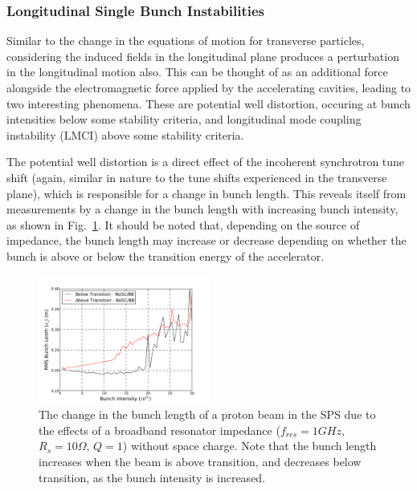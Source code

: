 \subsubsection{Longitudinal Single Bunch Instabilities}

Similar to the change in the equations of motion for transverse particles, considering the induced fields in the longitudinal plane produces a perturbation in the longitudinal motion also. This can be thought of as an additional force alongside the electromagnetic force applied by the accelerating cavities, leading to two interesting phenomena. These are potential well distortion, occuring at bunch intensities below some stability criteria, and longitudinal mode coupling instability (LMCI) above some stability criteria.

The potential well distortion is a direct effect of the incoherent synchrotron tune shift (again, similar in nature to the tune shifts experienced in the transverse plane), which is responsible for a change in bunch length. This reveals itself from measurements by a change in the bunch length with increasing bunch intensity, as shown in Fig.~\ref{fig:pot_well_dist}. It should be noted that, depending on the source of impedance, the bunch length may increase or decrease depending on whether the bunch is above or below the transition energy of the accelerator.

\begin{figure}
\begin{center}
\includegraphics[width=0.5\textwidth]{Wakefields_and_Impedances/figures/rms_bunch_length_AT_BT_BB.pdf}
\end{center}
\caption{The change in the bunch length of a proton beam in the SPS due to the effects of a broadband resonator impedance ($f_{res} = 1GHz$, $R_{s}=10 \Omega$, $Q=1$) without space charge. Note that the bunch length increases when the beam is above transition, and decreases below transition, as the bunch intensity is increased.}
\label{fig:pot_well_dist}
\end{figure}

